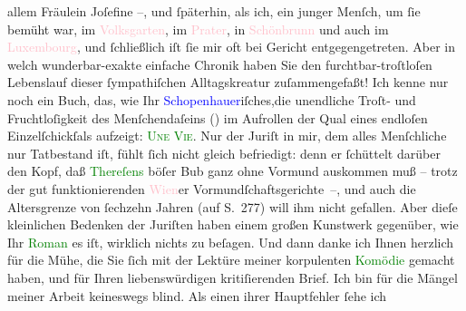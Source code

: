                     allem Fräulein Joſefine –, und ſpäterhin, als ich, ein junger Menſch, um ſie
                    bemüht war, im \textcolor{pink}{Volksgarten}{}\ledrightnote{\textcolor{pink}{Volksgarten}}, im \textcolor{pink}{Prater}{}\ledrightnote{\textcolor{pink}{Prater}}, in \textcolor{pink}{Schönbrunn}{}\ledrightnote{\textcolor{pink}{Schloß Schönbrunn}}
                    und auch im \textcolor{pink}{Luxembourg}{}\ledrightnote{\textcolor{pink}{Jardin du Luxembourg}}, und ſchließlich iſt
                    ſie mir oft bei Gericht entgegengetreten. Aber in welch wunderbar-exakte
                    einfache Chronik haben Sie den furchtbar-troſtloſen Lebenslauf dieser
                    ſympathiſchen Alltagskreatur zuſammengefaßt! Ich kenne nur noch ein Buch, das,
                    wie Ihr \textcolor{blue}{Schopenhauer}{}\ledrightnote{\textcolor{blue}{Arthur Schopenhauer}}iſches,die unendliche
                    Troſt- und Fruchtloſigkeit des Menſchendaſeins (\textsc{\label{K_L02500_1v}\label{K_L02500_1h}}) im Aufrollen der Qual eines endloſen Einzelſchickſals aufzeigt: \textsc{\textcolor{green}{Une Vie}{}\ledrightnote{\textcolor{green}{Ein Leben}}}.\pend
           \pstart
           {\pb}Nur der Juriſt in mir, dem alles
                    Menſchliche nur Tatbestand iſt, fühlt ſich nicht gleich befriedigt: denn er
                    ſchüttelt darüber den Kopf, daß \textcolor{green}{Thereſens}{} böſer Bub ganz ohne Vormund auskommen muß – trotz der gut
                    funktionierenden \textcolor{pink}{Wien}{}\ledrightnote{\textcolor{pink}{Wien}}er
                    Vormundſchaftsgerichte –, und auch die Altersgrenze von ſechzehn Jahren (auf
                    S. 277) will ihm nicht gefallen. Aber dieſe kleinlichen Bedenken der Juriſten
                    haben einem großen Kunstwerk gegenüber, wie Ihr \textcolor{green}{Roman}{} es iſt, wirklich nichts zu beſagen.\pend
           \pstart
           Und dann danke ich Ihnen herzlich für die Mühe, die Sie ſich mit der Lektüre
                    meiner korpulenten \textcolor{green}{Komödie}{}
                    gemacht haben, und für Ihren liebenswürdigen kritiſierenden Brief. Ich bin für
                    die Mängel meiner Arbeit keineswegs blind. Als einen ihrer Hauptfehler ſehe ich
